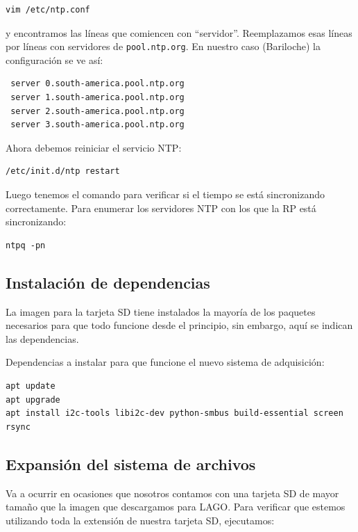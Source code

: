 \documentclass[a4paper,11pt]{article}
\begin{document}
\begin{verbatim}
vim /etc/ntp.conf
\end{verbatim}

\noindent y encontramos las líneas que comiencen con ``servidor''. Reemplazamos esas líneas
por líneas con servidores de \texttt{pool.ntp.org}. En nuestro caso (Bariloche)
la configuración se ve así:

\begin{verbatim}
 server 0.south-america.pool.ntp.org
 server 1.south-america.pool.ntp.org
 server 2.south-america.pool.ntp.org
 server 3.south-america.pool.ntp.org
\end{verbatim}

\noindent Ahora debemos reiniciar el servicio NTP:

\begin{verbatim}
/etc/init.d/ntp restart
\end{verbatim}

\noindent Luego tenemos el comando para verificar si el tiempo se está
sincronizando correctamente. Para enumerar los servidores NTP con los que la RP está
sincronizando:

\begin{verbatim}
ntpq -pn
\end{verbatim}

\subsection{Instalación de dependencias}

La imagen para la tarjeta SD tiene instalados la mayoría de los paquetes
necesarios para que todo funcione desde el principio, sin embargo, aquí se
indican las dependencias.

\noindent Dependencias a instalar para que funcione el nuevo sistema de
adquisición:

\begin{verbatim}
apt update
apt upgrade
apt install i2c-tools libi2c-dev python-smbus build-essential screen rsync
\end{verbatim}

\subsection{Expansión del sistema de archivos}\label{subsub_expansion_sd}
Va a ocurrir en ocasiones que nosotros contamos con una tarjeta SD de mayor
tamaño que la imagen que descargamos para LAGO. Para verificar que estemos
utilizando toda la extensión de nuestra tarjeta SD, ejecutamos: 
\end{document}
